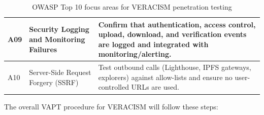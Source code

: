 \begin{table}[htbp]
{\begin{tabular}{|>{\raggedright\arraybackslash}p{1.5cm}|
                  >{\raggedright\arraybackslash}p{4.0cm}|
                  >{\raggedright\arraybackslash}p{6.9cm}|}
    A09 &
    Security Logging and Monitoring Failures &
    Confirm that authentication, access control, upload, download, and
    verification events are logged and integrated with monitoring/alerting. \\
    \hline

    A10 &
    Server-Side Request Forgery (SSRF) &
    Test outbound calls (Lighthouse, IPFS gateways, explorers) against
    allow-lists and ensure no user-controlled URLs are used. \\
    \hline
  \end{tabular}
  }%
  \captionsetup{type=table}
  \caption{OWASP Top 10 focus areas for VERACISM penetration testing}
  \label{table:owasp-focus}
\end{table}

\clearpage
The overall VAPT procedure for VERACISM will follow these steps:

